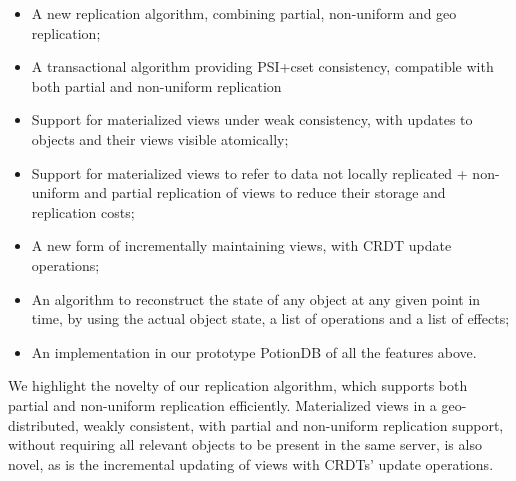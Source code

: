 \begin{itemize}
	\item A new replication algorithm, combining partial, non-uniform and geo replication;
	\item A transactional algorithm providing PSI+cset consistency, compatible with both partial and non-uniform replication
	\item Support for materialized views under weak consistency, with updates to objects and their views visible atomically;
	\item Support for materialized views to refer to data not locally replicated + non-uniform and partial replication of views to reduce their storage and replication costs;
	\item A new form of incrementally maintaining views, with CRDT update operations;
	\item An algorithm to reconstruct the state of any object at any given point in time, by using the actual object state, a list of operations and a list of effects;
	\item An implementation in our prototype PotionDB of all the features above.
\end{itemize}

We highlight the novelty of our replication algorithm, which supports both partial and non-uniform replication efficiently.
Materialized views in a geo-distributed, weakly consistent, with partial and non-uniform replication support, without requiring all relevant objects to be present in the same server, is also novel, as is the incremental updating of views with CRDTs' update operations.

